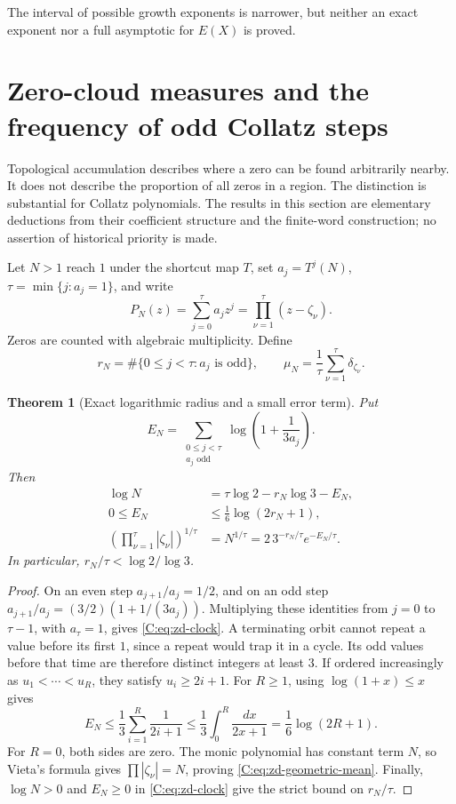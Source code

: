\documentclass[11pt,a4paper]{article}
\newtheorem{theorem}{Theorem}[section]
\theoremstyle{definition}
\theoremstyle{remark}
\numberwithin{equation}{section}
\begin{document}
The interval of possible growth exponents is narrower, but neither
an exact exponent nor a full asymptotic for $E(X)$ is proved.

\section{Zero-cloud measures and the frequency of odd Collatz steps}
\label{C:sec:zd-distribution}

Topological accumulation describes where a zero can be found arbitrarily
nearby. It does not describe the proportion of all zeros in a region.
The distinction is substantial for Collatz polynomials. The results in this
section are elementary deductions from their coefficient structure and the
finite-word construction; no assertion of historical priority is made.

Let $N>1$ reach $1$ under the shortcut map $T$, set
$a_j=T^j(N)$, $\tau=\min\{j:a_j=1\}$, and write
\[
 P_N(z)=\sum_{j=0}^{\tau}a_jz^j
       =\prod_{\nu=1}^{\tau}(z-\zeta_\nu).
\]
Zeros are counted with algebraic multiplicity. Define
\[
 r_N=\#\{0\le j<\tau:a_j\text{ is odd}\},\qquad
 \mu_N=\frac1\tau\sum_{\nu=1}^{\tau}\delta_{\zeta_\nu}.
\]

\begin{theorem}[Exact logarithmic radius and a small error term]
\label{C:thm:zd-radius-clock}
Put
\[
 E_N=\sum_{\substack{0\le j<\tau\\a_j\text{ odd}}}
        \log\left(1+\frac1{3a_j}\right).
\]
Then
\begin{align}
 \log N&=\tau\log2-r_N\log3-E_N,
 \label{C:eq:zd-clock}\\
 0\le E_N&\le\frac16\log(2r_N+1),
 \label{C:eq:zd-error}\\
 \left(\prod_{\nu=1}^{\tau}|\zeta_\nu|\right)^{1/\tau}
 &=N^{1/\tau}
 =2\,3^{-r_N/\tau}e^{-E_N/\tau}.
 \label{C:eq:zd-geometric-mean}
\end{align}
In particular, $r_N/\tau<\log2/\log3$.
\end{theorem}
\begin{proof}
On an even step $a_{j+1}/a_j=1/2$, and on an odd step
$a_{j+1}/a_j=(3/2)(1+1/(3a_j))$. Multiplying these identities from
$j=0$ to $\tau-1$, with $a_\tau=1$, gives
\eqref{C:eq:zd-clock}. A terminating orbit cannot repeat a value before
its first $1$, since a repeat would trap it in a cycle. Its odd values
before that time are therefore distinct integers at least $3$.
If ordered increasingly as $u_1<\cdots<u_R$, they satisfy $u_i\ge2i+1$.
For $R\ge1$, using $\log(1+x)\le x$ gives
\[
 E_N\le\frac13\sum_{i=1}^R\frac1{2i+1}
 \le\frac13\int_0^R\frac{dx}{2x+1}
 =\frac16\log(2R+1).
\]
For $R=0$, both sides are zero. The monic polynomial has constant term
$N$, so Vieta's formula gives $\prod|\zeta_\nu|=N$, proving
\eqref{C:eq:zd-geometric-mean}. Finally, $\log N>0$ and $E_N\ge0$ in
\eqref{C:eq:zd-clock} give the strict bound on $r_N/\tau$.
\end{proof}
\end{document}
